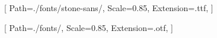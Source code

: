 \newfontfamily{}[
    Path=./fonts/stone-sans/,
    Scale=0.85,
    Extension=.ttf,
]

\newfontfamily{}[
    Path=./fonts/,
    Scale=0.85,
    Extension=.otf,
]

\newcommand{\YUGE}{\fontsize{36pt}{43pt}\selectfont}
\newcommand{\Yuge}{\fontsize{30pt}{36pt}\selectfont}
\newcommand{\yuge}{\fontsize{27pt}{32pt}\selectfont}

\usepackage{lettrine}
\setcounter{DefaultLines}{2}
\renewcommand{\DefaultLoversize}{0.1}
\renewcommand{\DefaultLraise}{0}
\renewcommand{\LettrineTextFont}{}
\setlength{\DefaultFindent}{\fontdimen2\font}
\setlength{\DefaultNindent}{0em}

\usepackage{enotez}
{}

\makeatletter
\newcommand*\halftitlepage{\begingroup
  \setlength\drop{0.1\textheight}
  \begin{center}
  \vspace*{\drop}
  \rule{\textwidth}{0in}\par
  {\Yuge\titlefont\MakeUppercase{\thetitle}\par}
  \rule{\textwidth}{0in}\par
  \vfill
  \end{center}
\endgroup}
\makeatother

\makeatletter
\newlength\drop
\newcommand*\titleM{\begingroup %
  \setlength\drop{0.15\textheight}
  \begin{center}
  \vspace*{\drop}
  {\Huge\sffamily\MakeUppercase{\theauthor}\par}
  \vspace{3em}
  {\YUGE\titlefont\MakeUppercase{\thetitle\par}}
  \vspace{8em}
  \begin{minipage}{0.8\textwidth}
    {\LARGE\centering\sffamily\textit\subtitletranslation\par}
  \end{minipage}
  \par
  \vspace{12em}
  {\footnotesize\translators\par}
  \vspace{2em}
  {\footnotesize\editors\par}
  \vfill
  \end{center}
\endgroup}
\makeatother

